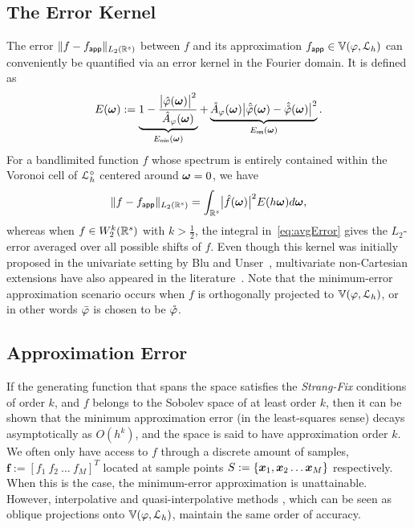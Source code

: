 \subsection{The Error Kernel}
The error $\lVert f - f_{\mathsf{app}} \rVert_{L_2(\mathbb{R}^s)}$ between $f$ and its approximation
$f_{\mathsf{app}} \in \mathbb{V}({\varphi},{\mathcal{L}_h})$ can conveniently be
quantified via an error kernel in the Fourier domain. It is defined as
\begin{equation}
	E(\vect{\omega}) := \underbrace{1 - \frac{\abs{\ft{\varphi}(\vect{\omega})}^2}{\ft{A}_{\varphi}(\vect{\omega})}}_{E_{\mathsf{min}}(\vect{\omega})}
	+ 
	\underbrace{
	\ft{A}_{\varphi}(\vect{\omega})
	\abs{\ft{\analysis{\varphi}}(\vect{\omega}) -
 		\ft{\dual{\varphi}}(\vect{\omega})}^2
  	}_{E_{\mathsf{res}}(\vect{\omega})}.
  \label{eq:scErrorKernel}
\end{equation}
For a bandlimited function $f$ whose spectrum is entirely contained
within the Voronoi cell of $\mathcal{L}^{\circ}_h$ centered around $\boldsymbol{\omega} = 0$, we have 
\begin{equation}
	\Ltwonorm{f - \appf{f}} = \int_{\reel^s}
	\abs{\ft{f}(\vect{\omega})}^2 E(h\vect{\omega}) d\vect{\omega},
	\label{eq:avgError}
\end{equation}
whereas when $f \in W_2^k(\mathbb{R}^s)$ with $k > \frac{1}{2}$, the integral in~\eqref{eq:avgError} gives the $L_2$-error averaged over all possible shifts of $f$. Even though this kernel was initially proposed in the univariate setting by Blu and Unser~\cite{blu99}, multivariate non-Cartesian extensions have also appeared in the literature~\cite{condat05hexagonal, condat07, condat08, alim10, condat11}. Note that the minimum-error approximation scenario occurs when $f$ is orthogonally projected to $\mathbb{V}({\varphi},{\mathcal{L}_h})$, or in other words ${\bar{\varphi}}$ is chosen to be ${\mathring{\varphi}}$.
 
\subsection{Approximation Error}

If the generating function that spans the space satisfies the \emph{Strang-Fix} conditions of order $k$, and $f$ belongs to the Sobolev space of at least order $k$, then it can be shown that the minimum approximation error (in the least-squares sense) decays asymptotically as $O(h^k)$, and the space is said to have approximation order $k$. We often only have access to $f$ through a discrete amount of samples, $\mathbf{f} := \left[ f_1 \ f_2 \ \hdots \ f_M \right]^T$ located at sample points $S := \{\boldsymbol{x}_1, \boldsymbol{x}_2 \hdots \boldsymbol{x}_M \}$ respectively. When this is the case, the minimum-error approximation is unattainable. However, interpolative and quasi-interpolative methods \cite{quasibcc,interprev}, which can be seen as oblique projections onto $\mathbb{V}({\varphi},{\mathcal{L}_h})$, maintain the same order of accuracy.


